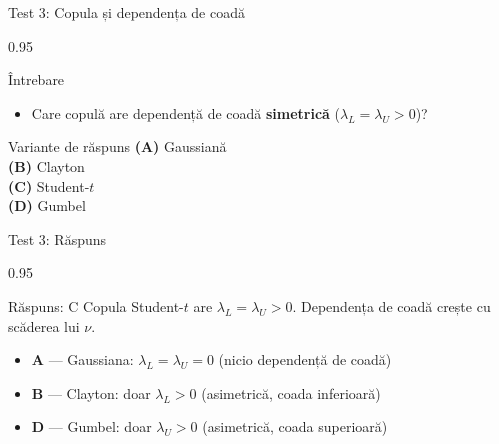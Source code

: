 \documentclass[9pt, aspectratio=169, t]{beamer}
\begin{document}
\begin{frame}{Test 3: Copula și dependența de coadă}
\begin{cminipage}{0.95\textwidth}
    \begin{alertblock}{Întrebare}
        \begin{itemize}\setlength{\itemsep}{0pt}
            \item Care copulă are dependență de coadă \textbf{simetrică} ($\lambda_L = \lambda_U > 0$)?
        \end{itemize}
    \end{alertblock}

    \vspace{0.3cm}

    \begin{block}{Variante de răspuns}
        \textcolor{MainBlue}{\textbf{(A)}} Gaussiană\\[3pt]
        \textcolor{MainBlue}{\textbf{(B)}} Clayton\\[3pt]
        \textcolor{MainBlue}{\textbf{(C)}} Student-$t$\\[3pt]
        \textcolor{MainBlue}{\textbf{(D)}} Gumbel
    \end{block}
\end{cminipage}
\end{frame}

\begin{frame}{Test 3: Răspuns}
\begin{cminipage}{0.95\textwidth}
    \begin{exampleblock}{Răspuns: C}
        Copula Student-$t$ are $\lambda_L = \lambda_U > 0$. Dependența de coadă crește cu scăderea lui $\nu$.
    \end{exampleblock}

    \vspace{0.2cm}

    \begin{itemize}\setlength{\itemsep}{0pt}
        \item \textbf{A} --- Gaussiana: $\lambda_L = \lambda_U = 0$ (nicio dependență de coadă) \incorrect
        \item \textbf{B} --- Clayton: doar $\lambda_L > 0$ (asimetrică, coada inferioară) \incorrect
        \item \textbf{D} --- Gumbel: doar $\lambda_U > 0$ (asimetrică, coada superioară) \incorrect
    \end{itemize}
\end{cminipage}
\end{frame}
\end{document}
